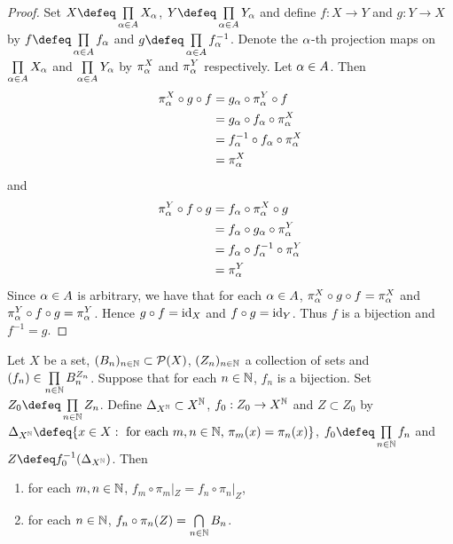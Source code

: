 \documentclass{book}
\begin{document}
	\begin{proof}
		Set $X \defeq \prod\limits_{\al \in A} X_{\al}$, $Y \defeq \prod\limits_{\al \in A}Y_{\al}$ and define $f: X \rightarrow Y$ and $g: Y \rightarrow X$ by $f \defeq \prod\limits_{\al \in A} f_{\al}$ and $g \defeq \prod\limits_{\al \in A} f_{\al}^{-1}$. Denote the $\alpha$-th projection maps on $\prod\limits_{\alpha \in A} X_{\alpha}$ and $\prod\limits_{\alpha \in A} Y_{\alpha}$ by $\pi^X_{\alpha}$ and $\pi^Y_{\alpha}$ respectively. Let $\alpha \in A$. Then
		\begin{align*}
			\pi_{\alpha}^X \circ g \circ f
			& = g_{\alpha} \circ \pi_{\alpha}^Y \circ f \\
			& = g_{\alpha} \circ f_{\alpha} \circ \pi_{\alpha}^X \\
			& = f_{\alpha}^{-1} \circ f_{\alpha} \circ \pi_{\alpha}^X \\
			& = \pi_{\alpha}^X
		\end{align*}
		and 
		\begin{align*}
			\pi_{\alpha}^Y \circ f \circ g
			& = f_{\alpha} \circ \pi_{\alpha}^X \circ g \\
			& = f_{\alpha} \circ g_{\alpha} \circ \pi_{\alpha}^Y \\
			& = f_{\alpha} \circ f_{\alpha}^{-1} \circ \pi_{\alpha}^Y  \\
			& = \pi_{\alpha}^Y 
		\end{align*}
		Since $\alpha \in A$ is arbitrary, we have that for each $\alpha \in A$, $\pi_{\alpha}^X \circ g \circ f = \pi_{\alpha}^X$ and $\pi_{\alpha}^Y \circ f \circ g = \pi_{\alpha}^Y$. Hence $g \circ f = \operatorname{id}_X$ and $f \circ g = \operatorname{id}_Y$. Thus $f$ is a bijection and $f^{-1} = g$. 
	\end{proof}

	\begin{ex} 
		Let $X$ be a set, $(B_n)_{n \in \mathbb{N}} \subset \mathcal{P}(X)$, $(Z_n)_{n \in \mathbb{N}}$ a collection of sets and $(f_n) \in \prod\limits_{n \in \mathbb{N}} B_n^{Z_n}$. Suppose that for each $n \in \mathbb{N}$, $f_n$ is a bijection. Set $Z_0 \defeq \prod\limits_{n \in \N} Z_n$. Define $\Delta_{X^{\mathbb{N}}} \subset X^{\mathbb{N}}$, $f_0: Z_0 \rightarrow X^{\mathbb{N}}$ and $Z \subset Z_0$ by $\Del_{X^{\N}} \defeq \{x \in X: \text{ for each $m,n \in \N$, $\pi_m(x) = \pi_n(x)$}\}$, $f_0 \defeq \prod\limits_{n \in \N} f_n$ and $Z \defeq f_0^{-1}(\Del_{X^{\N}})$. Then 
		\begin{enumerate}
			\item for each $m,n \in \mathbb{N}$, $f_m \circ \pi_m|_Z = f_n \circ \pi_n|_Z$,
			\item for each $n \in \mathbb{N}$, $f_n \circ \pi_n(Z) = \bigcap\limits_{n \in \mathbb{N}} B_n$.
		\end{enumerate}
	\end{ex}
	
\end{document}
